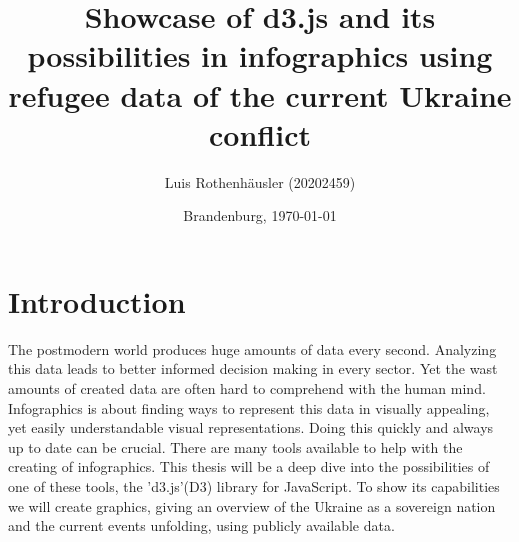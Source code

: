 \documentclass[
a4paper,     %
12pt         %
]{scrartcl}  %
\title{Showcase of d3.js and its possibilities in infographics using refugee data of the current Ukraine conflict}
\author{Luis Rothenh\"ausler (20202459)}
\date{Brandenburg, \today{}}
\begin{document}

 \maketitle

\tableofcontents





\newpage

\section{Introduction}
The postmodern world produces huge amounts of data every second. Analyzing this data leads to better informed decision making in every sector. Yet the wast amounts of created data are often hard to comprehend with the human mind. Infographics is about finding ways to represent this data in visually appealing, yet easily understandable visual representations. Doing this quickly and always up to date can be crucial. There are many tools available to help with the creating of infographics. This thesis will be a deep dive into the possibilities of one of these tools, the 'd3.js'(D3) library for JavaScript. To show its capabilities we will create graphics, giving an overview of the Ukraine as a sovereign nation and the current events unfolding, using publicly available data.
\end{document}
